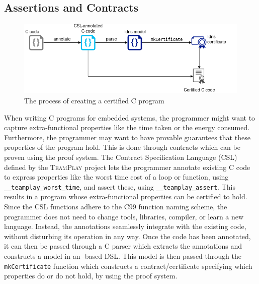     \subsection{Assertions and Contracts}
        \begin{figure}[H]
            \centering
            \includegraphics[width=\textwidth]{diagrams/process.png}
            \caption{The process of creating a certified C program}
        \end{figure}
        When writing C programs for embedded systems, the programmer might want to capture extra-functional properties like the time taken or the energy consumed. Furthermore, the programmer may want to have provable guarantees that these properties of the program hold. This is done through contracts which can be proven using the \Idris proof system. The Contract Specification Language (CSL) defined by the \textsc{TeamPlay} project \cite{teamplay:d1.1} lets the programmer annotate existing C code to express properties like the worst time cost of a loop or function, using \texttt{\_\_teamplay\_worst\_time}, and assert these, using \texttt{\_\_teamplay\_assert}. This results in a program whose extra-functional properties can be certified to hold. Since the CSL functions adhere to the C99 function naming scheme, the programmer does not need to change tools, libraries, compiler, or learn a new language. Instead, the annotations seamlessly integrate with the existing code, without disturbing its operation in any way. Once the code has been annotated, it can then be passed through a C parser which extracts the annotations and constructs a model in an \Idris-based DSL. This model is then passed through the \texttt{mkCertificate} function which constructs a contract/certificate specifying which properties do or do not hold, by using the \Idris proof system.
